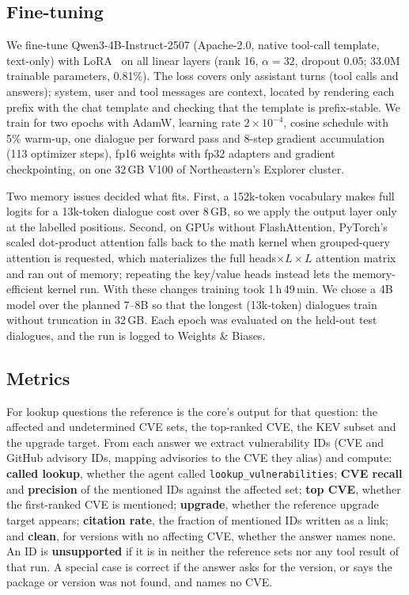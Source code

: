 \documentclass[final]{cvpr}
\begin{document}
\subsection{Fine-tuning}
\label{sec:ft}
We fine-tune Qwen3-4B-Instruct-2507 (Apache-2.0, native tool-call template, text-only) with LoRA~\cite{hu2022lora} on all linear layers (rank 16, $\alpha=32$, dropout 0.05; 33.0M trainable parameters, 0.81\%). The loss covers only assistant turns (tool calls and answers); system, user and tool messages are context, located by rendering each prefix with the chat template and checking that the template is prefix-stable. We train for two epochs with AdamW, learning rate $2\times10^{-4}$, cosine schedule with 5\% warm-up, one dialogue per forward pass and 8-step gradient accumulation (113 optimizer steps), fp16 weights with fp32 adapters and gradient checkpointing, on one 32\,GB V100 of Northeastern's Explorer cluster.

Two memory issues decided what fits. First, a 152k-token vocabulary makes full logits for a 13k-token dialogue cost over 8\,GB, so we apply the output layer only at the labelled positions. Second, on GPUs without FlashAttention, PyTorch's scaled dot-product attention falls back to the math kernel when grouped-query attention is requested, which materializes the full heads$\times L\times L$ attention matrix and ran out of memory; repeating the key/value heads instead lets the memory-efficient kernel run. With these changes training took 1\,h\,49\,min. We chose a 4B model over the planned 7--8B so that the longest (13k-token) dialogues train without truncation in 32\,GB. Each epoch was evaluated on the held-out test dialogues, and the run is logged to Weights \& Biases.

\subsection{Metrics}
\label{sec:metrics}
For lookup questions the reference is the core's output for that question: the affected and undetermined CVE sets, the top-ranked CVE, the KEV subset and the upgrade target. From each answer we extract vulnerability IDs (CVE and GitHub advisory IDs, mapping advisories to the CVE they alias) and compute: \textbf{called lookup}, whether the agent called \texttt{lookup\_vulnerabilities}; \textbf{CVE recall} and \textbf{precision} of the mentioned IDs against the affected set; \textbf{top CVE}, whether the first-ranked CVE is mentioned; \textbf{upgrade}, whether the reference upgrade target appears; \textbf{citation rate}, the fraction of mentioned IDs written as a link; and \textbf{clean}, for versions with no affecting CVE, whether the answer names none. An ID is \textbf{unsupported} if it is in neither the reference sets nor any tool result of that run. A special case is correct if the answer asks for the version, or says the package or version was not found, and names no CVE.
\end{document}
